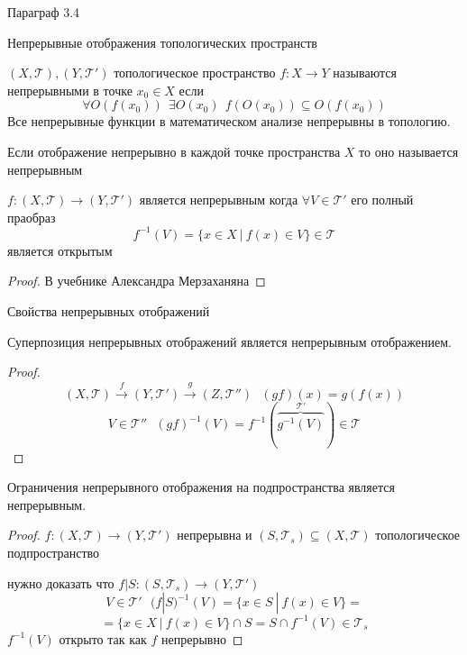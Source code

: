 \begin{title}[\Large]
  Параграф 3.4
\end{title}

\begin{title}[\Large]
  Непрерывные отображения топологических пространств
\end{title}

\begin{define}[непрерывности]
  $(X, \mathcal{T}), (Y, \mathcal{T}')$ топологическое пространство
  $f: X \to Y$ называются непрерывными в точке $x_0 \in X$ если
  $$
  \forall O(f(x_0)) ~~ \exists O(x_0) ~~ f(O(x_0)) \subseteq O(f(x_0))
  $$
  Все непрерывные функции в математическом анализе непрерывны в топологию.

  Если отображение непрерывно в каждой точке пространства $X$ то оно
  называется непрерывным
\end{define}

\begin{theorem}
  $f:(X, \mathcal{T}) \to (Y, \mathcal{T}')$ является непрерывным когда
  $\forall V \in \mathcal{T}'$ его полный праобраз
  $$
  f^{-1}(V) = \{ x \in X ~ | ~ f(x) \in V \} \in \mathcal{T}
  $$
  является открытым
\end{theorem}

\begin{proof}
  В учебнике Александра Мерзаханяна
\end{proof}

\begin{title}[\Large]
  Свойства непрерывных отображений
\end{title}

\begin{theorem}
  Суперпозиция непрерывных отображений является непрерывным отображением.
\end{theorem}

\begin{proof}
  $$
  (X, \mathcal{T}) \stackrel{f}{\to} (Y, \mathcal{T}') \stackrel{g}{\to}
  (Z, \mathcal{T}'') ~~~ (gf)(x) = g(f(x))
  $$
  $$
  V \in \mathcal{T}'' ~~~ (gf)^{-1}(V) =
  f^{-1}(\overbrace{g^{-1}(V)}^{\mathcal{T}'}) \in \mathcal{T}
  $$
\end{proof}

\begin{theorem}
  Ограничения непрерывного отображения на подпространства является непрерывным.
\end{theorem}

\begin{proof}
  $f: (X, \mathcal{T}) \to (Y, \mathcal{T}')$ непрерывна и $(S, \mathcal{T}_s)
  \subseteq (X, \mathcal{T})$ топологическое подпространство

  нужно доказать что $f|S : (S, \mathcal{T}_s) \to (Y, \mathcal{T}')$
  $$
  V \in \mathcal{T}' ~~~ (f | S)^{-1}(V) = \{ x \in S ~ | ~ f(x) \in V \} =
  $$
  $$
  = \{x \in X ~ | ~ f(x) \in V\} \cap S = S \cap f^{-1}(V) \in \mathcal{T}_s
  $$
  $f^{-1}(V)$ открыто так как $f$ непрерывно
\end{proof}

